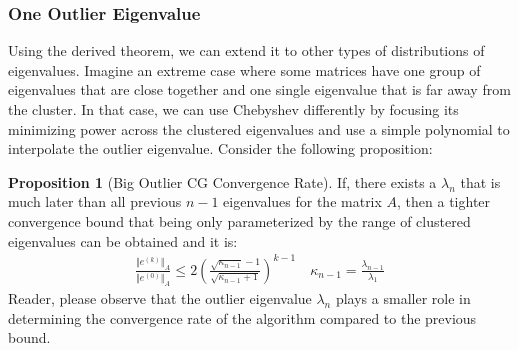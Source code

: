 \documentclass[]{article}
\theoremstyle{definition}
\newtheorem{prop}{Proposition}[section]  %
\begin{document}
        \subsubsection{One Outlier Eigenvalue}
            Using the derived theorem, we can extend it to other types of distributions of eigenvalues. Imagine an extreme case where some matrices have one group of eigenvalues that are close together and one single eigenvalue that is far away from the cluster. In that case, we can use Chebyshev differently by focusing its minimizing power across the clustered eigenvalues and use a simple polynomial to interpolate the outlier eigenvalue. Consider the following proposition: 
            \begin{prop}[Big Outlier CG Convergence Rate]
                If, there exists a $\lambda_n$ that is much later than all previous $n - 1$ eigenvalues for the matrix $A$, then a tighter convergence bound that being only parameterized by the range of clustered eigenvalues can be obtained and it is: 
                \begin{align}
                    \frac{\Vert e^{(k)}\Vert_A}{\Vert e^{(0)}\Vert_A} \le 
                    2 \left(
                        \frac{\sqrt{\kappa_{n - 1}} - 1}{\sqrt{\kappa_{n - 1} + 1}}
                    \right)^{k - 1}\quad 
                    \kappa_{n - 1} =  \frac{\lambda_{n - 1}}{\lambda_1}
                \end{align}
                Reader, please observe that the outlier eigenvalue $\lambda_n$ plays a smaller role in determining the convergence rate of the algorithm compared to the previous bound. 
            \end{prop}
\end{document}
